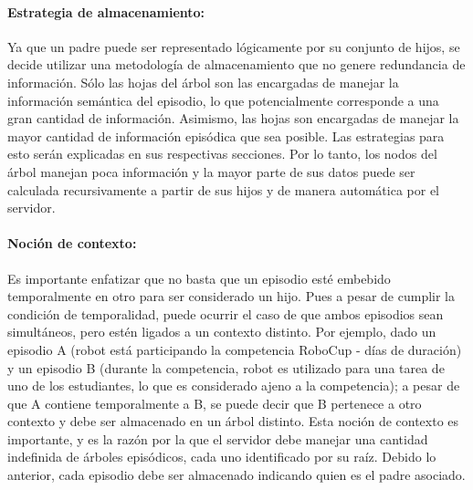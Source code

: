 \paragraph{Estrategia de almacenamiento:}
Ya que un padre puede ser representado lógicamente por su conjunto de hijos, se decide utilizar una metodología de almacenamiento que no genere redundancia de información. Sólo las hojas del árbol son las encargadas de manejar la información semántica del episodio, lo que potencialmente corresponde a una gran cantidad de información. Asimismo, las hojas son encargadas de manejar la mayor cantidad de información episódica que sea posible. Las estrategias para esto serán explicadas en sus respectivas secciones. Por lo tanto, los nodos del árbol manejan poca información y la mayor parte de sus datos puede ser calculada recursivamente a partir de sus hijos y de manera automática por el servidor.

\paragraph{Noción de contexto:}
Es importante enfatizar que no basta que un episodio esté embebido temporalmente en otro para ser considerado un hijo. Pues a pesar de cumplir la condición de temporalidad, puede ocurrir el caso de que ambos episodios sean simultáneos, pero estén ligados a un contexto distinto. Por ejemplo, dado un episodio A (robot está participando la competencia RoboCup - días de duración) y un episodio B (durante la competencia, robot es utilizado para una tarea de uno de los estudiantes, lo que es considerado ajeno a la competencia); a pesar de que A contiene temporalmente a B, se puede decir que B pertenece a otro contexto y debe ser almacenado en un árbol distinto. Esta noción de contexto es importante, y es la razón por la que el servidor debe manejar una cantidad indefinida de árboles episódicos, cada uno identificado por su raíz. Debido lo anterior, cada episodio debe ser almacenado indicando quien es el padre asociado.

